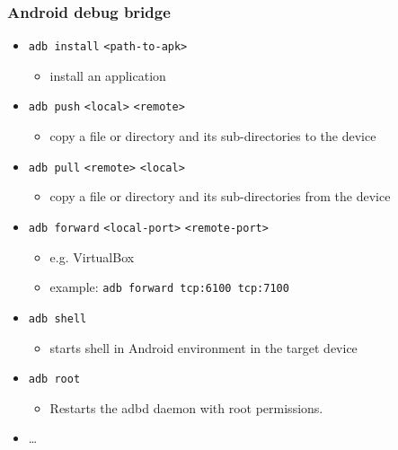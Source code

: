 \documentclass[10pt,xcolor=pdflatex]{beamer}
\begin{document}
\begin{frame}[fragile]\frametitle{Android debug bridge}
	\begin{itemize}
		\item \texttt{adb install} \verb:<path-to-apk>:
          \begin{itemize}
            \item install an application
          \end{itemize}
        \item \texttt{adb push} \verb:<local>: \verb:<remote>:
          \begin{itemize}
            \item copy a file or directory and its sub-directories to the device
          \end{itemize}
		\item \texttt{adb pull} \verb:<remote>: \verb:<local>:
          \begin{itemize}
            \item copy a file or directory and its sub-directories from the device
          \end{itemize}
		
		\item \texttt{adb forward} \verb:<local-port>: \verb:<remote-port>:
          \begin{itemize}
        	\item e.g. VirtualBox
            \item example: \texttt{adb forward tcp:6100 tcp:7100}
          \end{itemize}
		\item \texttt{adb shell}
          \begin{itemize}
        	\item starts shell in Android environment in the target device
          \end{itemize}
        \item \texttt{adb root}
          \begin{itemize}
            \item Restarts the adbd daemon with root permissions.
          \end{itemize}
        \item \ldots
	\end{itemize}
\end{frame}
\end{document}
